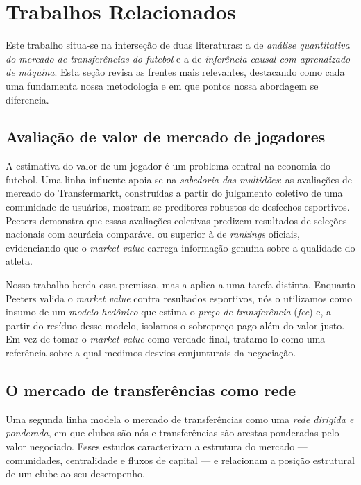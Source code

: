\documentclass[12pt]{article}
\begin{document}
\section{Trabalhos Relacionados}

Este trabalho situa-se na interseção de duas literaturas: a de \textit{análise quantitativa do
mercado de transferências do futebol} e a de \textit{inferência causal com aprendizado de máquina}.
Esta seção revisa as frentes mais relevantes, destacando como cada uma fundamenta nossa metodologia
e em que pontos nossa abordagem se diferencia.

\subsection{Avaliação de valor de mercado de jogadores}

A estimativa do valor de um jogador é um problema central na economia do futebol. Uma linha
influente apoia-se na \textit{sabedoria das multidões}: as avaliações de mercado do Transfermarkt,
construídas a partir do julgamento coletivo de uma comunidade de usuários, mostram-se preditores
robustos de desfechos esportivos. Peeters \cite{peeters2018} demonstra que essas avaliações coletivas
predizem resultados de seleções nacionais com acurácia comparável ou superior à de \textit{rankings}
oficiais, evidenciando que o \textit{market value} carrega informação genuína sobre a qualidade do
atleta.

Nosso trabalho herda essa premissa, mas a aplica a uma tarefa distinta. Enquanto Peeters
\cite{peeters2018} valida o \textit{market value} contra resultados esportivos, nós o utilizamos como insumo de um
\textit{modelo hedônico} que estima o \textit{preço de transferência} (\textit{fee}) e, a partir do
resíduo desse modelo, isolamos o sobrepreço pago além do valor justo. Em vez de tomar o
\textit{market value} como verdade final, tratamo-lo como uma referência sobre a qual medimos
desvios conjunturais da negociação.

\subsection{O mercado de transferências como rede}

Uma segunda linha modela o mercado de transferências como uma \textit{rede dirigida e ponderada},
em que clubes são nós e transferências são arestas ponderadas pelo valor negociado. Esses estudos
caracterizam a estrutura do mercado — comunidades, centralidade e fluxos de capital — e relacionam a
posição estrutural de um clube ao seu desempenho.
\end{document}
